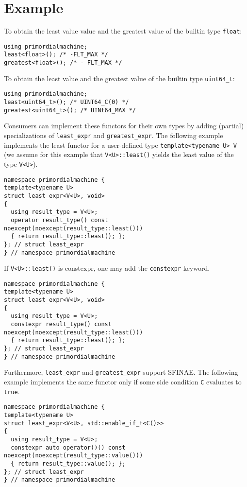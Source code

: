 \chapter{Example}
To obtain the least value value and the greatest value of the builtin type \verb+float+:
\begin{verbatim}
using primordialmachine;
least<float>(); /* -FLT_MAX */
greatest<float>(); /* - FLT_MAX */
\end{verbatim}
To obtain the least value and the greatest value of the builtin type \verb+uint64_t+:
\begin{verbatim}
using primordialmachine;
least<uint64_t>(); /* UINT64_C(0) */
greatest<uint64_t>(); /* UINt64_MAX */
\end{verbatim}

Consumers can implement these functors for their own types by adding (partial) specializations of \verb+least_expr+ and \verb+greatest_expr+.
The following example implements the least functor for a user-defined type \verb+template<typename U> V+ (we assume for this example
that \verb+V<U>::least()+ yields the least value of the type \verb+V<U>+).
\begin{verbatim}
namespace primordialmachine {
template<typename U>
struct least_expr<V<U>, void>
{
  using result_type = V<U>;
  operator result_type() const noexcept(noexcept(result_type::least()))
  { return result_type::least(); };
}; // struct least_expr
} // namespace primordialmachine
\end{verbatim}

If \verb+V<U>::least()+ is constexpr, one may add the \verb+constexpr+ keyword.
\begin{verbatim}
namespace primordialmachine {
template<typename U>
struct least_expr<V<U>, void>
{
  using result_type = V<U>;
  constexpr result_type() const noexcept(noexcept(result_type::least()))
  { return result_type::least(); };
}; // struct least_expr
} // namespace primordialmachine
\end{verbatim}

Furthermore, \verb+least_expr+ and \verb+greatest_expr+ support SFINAE.
The following example implements the same functor only if some side condition \verb+C+ evaluates to \verb+true+.
\begin{verbatim}
namespace primordialmachine {
template<typename U>
struct least_expr<V<U>, std::enable_if_t<C()>>
{
  using result_type = V<U>;
  constexpr auto operator()() const noexcept(noexcept(result_type::value()))
  { return result_type::value(); };
}; // struct least_expr
} // namespace primordialmachine
\end{verbatim}
